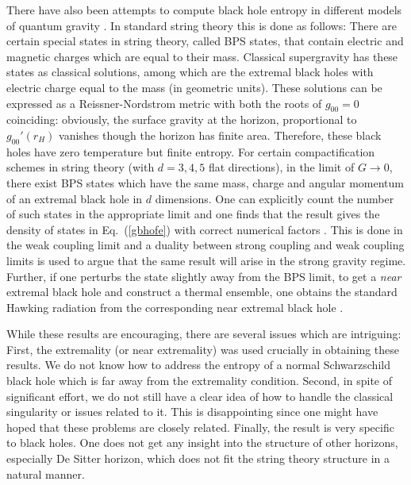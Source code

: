 \documentclass[12pt]{iopart}
\def\eq#1{{Eq.~(\ref{#1})}}
\begin{document}
There have also been attempts to compute black hole entropy in different models of quantum gravity \cite{Peet:2000hn}.
In standard string theory this is done as follows: There are certain special states in string theory, called BPS states,
 that contain electric and magnetic charges which are equal to their mass. Classical supergravity has these states as classical solutions, among which are the extremal black holes with electric charge equal to the mass (in geometric units). These solutions can be expressed as a Reissner-Nordstrom metric with both the roots of $g_{00}=0$ coinciding: obviously, the surface gravity at the horizon, proportional to $g_{00}'(r_H)$ vanishes though the horizon has finite area. Therefore, these black holes
 have zero temperature but finite entropy. For certain compactification schemes in string theory (with
$d=3,4,5$ flat directions), in the limit of
$G\to 0$, there exist BPS states which have the same mass, charge and angular momentum of an extremal black hole in $d$
dimensions. One can explicitly count the number of such states in the appropriate limit and one finds that the result gives the density of states in \eq{gbhofe}  with correct numerical factors \cite{Strominger:1996sh,Das:2000su,Breckenridge:1996sn}.
 This is done in the weak coupling limit
and a duality between strong coupling and weak coupling limits 
is used to argue that the same result will arise in the 
strong gravity regime. Further, if one perturbs the state slightly away from the BPS limit, to get a {\it near} extremal black hole
and construct a thermal ensemble, one obtains the standard Hawking radiation from the corresponding near extremal black hole
 \cite{Breckenridge:1996sn}.
 

While these results are encouraging, there are several issues which are intriguing: First, the extremality (or near extremality) was used crucially in obtaining these results. We do not know how to address the entropy of a normal Schwarzschild black hole which is far away from the extremality condition. Second, in spite of significant effort, we do not still have a clear idea of
 how to handle the classical singularity or issues related to it. This is disappointing since one might have hoped that these problems are closely related. Finally, the result is very specific to black holes. One does not get any insight into the structure of other horizons, especially De Sitter horizon, which does not fit the string theory structure in a natural manner.
\end{document}
